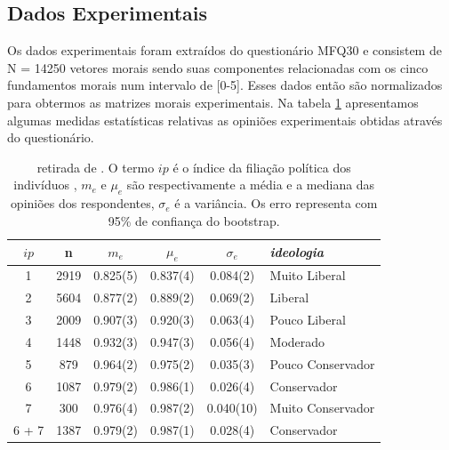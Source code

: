 \newpage
\subsection{Dados Experimentais}  %

Os dados experimentais foram extraídos do questionário MFQ30\cite{Quest}
e consistem de N = 14250 vetores morais sendo suas componentes relacionadas
com os cinco fundamentos morais num intervalo de [0-5]. Esses dados então são
normalizados para obtermos as matrizes morais experimentais. Na tabela
\ref{tab:data} apresentamos algumas medidas estatísticas relativas as opiniões
experimentais obtidas através do questionário.

\begin{table}
    \begin{tabular}{cccccl}
        \hline
        $ip$ & n & $m_e$& $\mu_e$  &  $\sigma_e$ & \textit{ideologia} \\ \hline
          1  & 2919 & 0.825(5) & 0.837(4) & 0.084(2)  & Muito Liberal \\ 
          2  & 5604 & 0.877(2) & 0.889(2) & 0.069(2)  & Liberal  \\
          3  & 2009 & 0.907(3) & 0.920(3) & 0.063(4)  & Pouco Liberal  \\
          4  & 1448 & 0.932(3) & 0.947(3) & 0.056(4)  & Moderado  \\
          5  & 879  & 0.964(2) & 0.975(2) & 0.035(3)  & Pouco Conservador \\
          6  & 1087 & 0.979(2) & 0.986(1) & 0.026(4)  & Conservador  \\
          7  & 300  & 0.976(4) & 0.987(2) & 0.040(10) & Muito Conservador  \\
       6 + 7 & 1387 & 0.979(2) & 0.987(1) & 0.028(4)  & Conservador  \\ \hline
    \end{tabular}
    \caption{
        retirada de \citep{Caticha2011a}. O termo $ip$ é o índice
        da filiação política dos indivíduos , $m_e$ e $\mu_e$ são
        respectivamente a média e a mediana das opiniões dos respondentes,
        $\sigma_e$ é a variância. Os erro representa com 95\% de confiança do
        bootstrap.
    }
    \label{tab:data}
\end{table}

